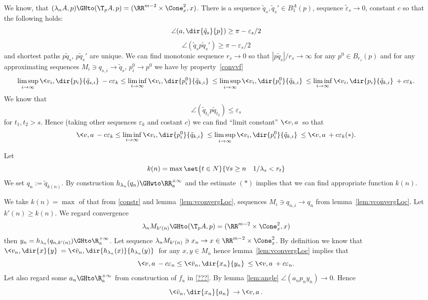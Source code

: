 We know, that $(\lambda_n A, p)\GHto (\T_p A, p)=(\RR^{m-2}\times \Cone_x^2,x)$.
There is a sequence $\tilde q_s, \tilde q_s' \in B_1^A(p)$,
 sequence $\tilde \varepsilon_s\to 0$, constant $c$ so that the following holds:
$$\angle(a,\dir{\tilde q_s}{p})\ge\pi- \varepsilon_s/2$$
 $$\angle(\tilde q_s p\tilde q_s')\ge\pi- \varepsilon_s/2$$
and shortest paths $p\tilde q_s$, $p\tilde q_s'$ are unique.
We can find monotonic sequence $r_s\to 0$ so that $|p\tilde q_s|/r_s\to\infty$
for any $p^0\in B_{r_s}(p)$
and for any approximating sequences
$M_i\ni q_{s,i}\to \tilde q_s$, $p^0_i\to p^0$ we have by property~\ref{convvf}
$$\limsup_{i\to\infty}  \< v_i,\dir{p_i}{\tilde q_{s,i}}\> -c\varepsilon_k\le
\liminf_{i\to\infty}  \<v_i,\dir{p^0_i}{\tilde q_{k,i}}\>\le\limsup_{i\to\infty}  \< v_i,\dir{p^0_i}{\tilde q_{k,i}}\>
\le\liminf_{i\to\infty}  \<v_i,\dir{p_i}{\tilde q_{k,i}}\> +c\varepsilon_k .
$$
We know that $$\angle(\tilde q_{t_1}p\tilde q_{t_2})\le\varepsilon_s$$ for $t_1, t_2>s$.
Hence (taking other sequences $\varepsilon_k$ and costant $c$)
we can find ``limit constant'' $\<v,a\>$ so that
 $$\<v,a\>-c\varepsilon_k\le
\liminf_{i\to\infty}
\<v_i,\dir{p^0_i}{\tilde q_{k,i}}\>\le\limsup_{i\to\infty}  \< v_i,\dir{p^0_i}{\tilde q_{k,i}}\>
\le\<v,a\> +c\varepsilon_k(*).$$

Let
$$k(n)=\max\set{t\in N}{\forall s\ge n\quad 1/\lambda_s<r_t}$$
We set $q_n:=\tilde q_{k(n)}$.
By construction $h_{\lambda_n}( q_n)\GHwto\RR_a^{+\infty}$
and the estimate $(*)$ implies that we can find appropriate function $k(n)$.
\qeds


We take $k(n)=\max$ of that from \ref{constr}
and lemma~\ref{lem:vconvergLoc},
sequences
$M_i\ni q_{n,i}\to q_n$ from  lemma~\ref{lem:vconvergLoc}.
Let $k'(n)\ge k(n)$.
We regard convergence
$$\lambda_n M_{k'(n)}\GHto (\T_p A, p)=(\RR^{m-2}\times \Cone_x^2,x)$$
then $y_n=h_{\lambda_n}(q_{n, k'(n)})\GHto \R_a^{+\infty} $.
Let sequence $\lambda_n M_{k'(n)}\ni x_n\to x\in \RR^{m-2}\times \Cone_x^2$.
By definition we know that
 $\<v_n,\dir{x}{y}\>=\<\bar v_n, \dir{h_{\lambda_n}(x)}{h_{\lambda_n}(y )}\>$
for any $x,y\in M_n$
hence lemma~\ref{lem:vconvergLoc} implies that
$$\<v,a\>-c\varepsilon_n\le\<\bar v_n,\dir{x_n}{y_n}\>\le\<v,a\>+c\varepsilon_n.$$
Let also regard some
$a_n\GHto \R_a^{+\infty} $ from construction of $f_a$ in \ref{???}.
By lemma \ref{lem:angle}
$\angle (a_n p_n y_n)\to 0$.
Hence
$$\<\bar v_n,\dir{x_n}{a_n}\>\to\<v,a\>.$$
\qeds

